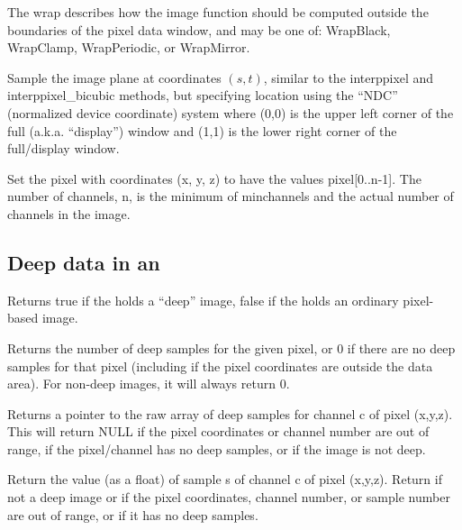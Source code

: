 The {\cf wrap} describes how the image function should be computed
outside the boundaries of the pixel data window, and may be one of:
{\cf WrapBlack}, {\cf WrapClamp}, {\cf WrapPeriodic}, or {\cf WrapMirror}.
\apiend

Sample the image plane at coordinates $(s,t)$, similar to the
{\cf\small interppixel} and {\cf\small interppixel_bicubic} methods, but
specifying location using the ``NDC'' (normalized
device coordinate) system where (0,0) is the upper left corner of the full
(a.k.a. ``display'') window and (1,1) is the lower right corner of the
full/display window.
\apiend

Set the pixel with coordinates {\cf (x, y, z)} to have the values
{\cf pixel[0..n-1]}.  The number of channels, {\cf n}, is the minimum of
{\cf minchannels} and the actual number of channels in the image.
\apiend


\subsection*{Deep data in an \ImageBuf}

Returns {\cf true} if the \ImageBuf holds a ``deep'' image, {\cf false}
if the \ImageBuf holds an ordinary pixel-based image.
\apiend

Returns the number of deep samples for the given pixel, or 0 if there
are no deep samples for that pixel (including if the pixel coordinates
are outside the data area).  For non-deep images, it will always return 0.
\apiend

Returns a pointer to the raw array of deep samples for channel {\cf c}
of pixel {\cf (x,y,z)}.  This will return {\cf NULL} if the pixel
coordinates or channel number are out of range, if the pixel/channel has
no deep samples, or if the image is not deep.
\apiend


Return the value (as a {\cf float}) of sample {\cf s} of channel {\cf c}
of pixel {\cf (x,y,z)}.  Return {} if not a deep image or if the
pixel coordinates, channel number, or sample number are out of range, or
if it has no deep samples.
\apiend

